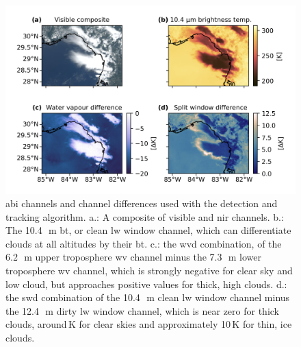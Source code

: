 \begin{figure}[tp]
    \includegraphics[width=\textwidth]{figures/chapter1_03.png}
    \caption[
    \acrshort{abi} channels and channel differences used with the detection and tracking algorithm
    ]{
    \acrshort{abi} channels and channel differences used with the detection and tracking algorithm. a.: A composite of visible and \acrshort{nir} channels. b.: The 10.4\,\unit{\mu m} \acrshort{bt}, or clean \acrshort{lw} window channel, which can differentiate clouds at all altitudes by their \acrshort{bt}. c.: the \acrshort{wvd} combination, of the 6.2\,\unit{\mu m} upper troposphere \acrshort{wv} channel minus the 7.3\,\unit{\mu m} lower troposphere \acrshort{wv} channel, which is strongly negative for clear sky and low cloud, but approaches positive values for thick, high clouds. d.: the \acrshort{swd} combination of the 10.4\,\unit{\mu m} clean \acrshort{lw} window channel minus the 12.4\,\unit{\mu m} dirty \acrshort{lw} window channel, which is near zero for thick clouds, around\,\unit{K} for clear skies and approximately 10\,\unit{K} for thin, ice clouds.
    }
    \label{fig:abi_channels}
\end{figure}



